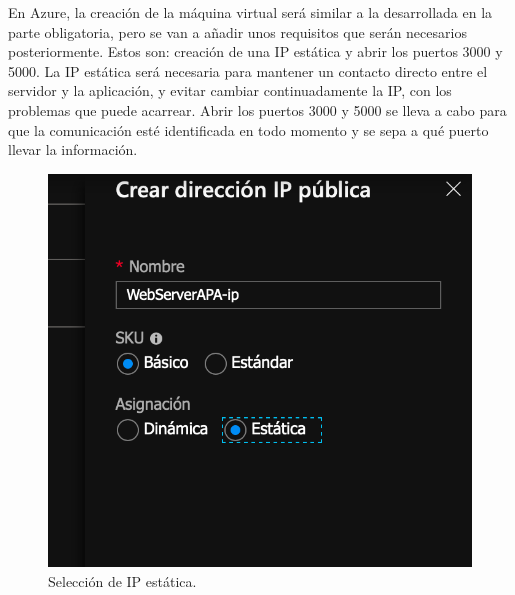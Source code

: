 \documentclass[10pt]{article}
\begin{document}
En Azure, la creación de la máquina virtual será similar a la desarrollada en la
parte obligatoria, pero se van a añadir unos requisitos que serán necesarios
posteriormente. Estos son: creación de una IP estática y abrir los puertos 3000 y
5000. La IP estática será necesaria para mantener un contacto directo entre el
servidor y la aplicación, y evitar cambiar continuadamente la IP, con los problemas
que puede acarrear. Abrir los puertos 3000 y 5000 se lleva a cabo para que la
comunicación esté identificada en todo momento y se sepa a qué puerto llevar la
información.

\begin{figure}[h!]
 \includegraphics[width=\linewidth]{./Web/Azure/Azure1.png}
 \caption{Selección de IP estática.}
\end{figure}
\end{document}
